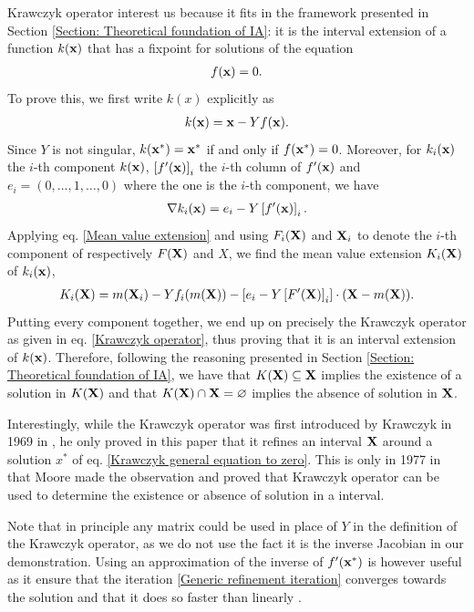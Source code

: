 \documentclass[
11pt, %
english, %
singlespacing, %
nolistspacing, %
liststotoc, %
headsepline, %
]{MastersDoctoralThesis} %
\begin{document}
Krawczyk operator interest us because it fits in the framework presented in Section \ref{Section: Theoretical foundation of IA}: it is the interval extension of a function $k(\boldsymbol{\mathrm{x}})$ that has a fixpoint for solutions of the equation
\begin{align}
	f(\boldsymbol{\mathrm{x}}) = 0. \label{Krawczyk general equation to zero}
\end{align}
To prove this, we first write $k(x)$ explicitly as
\begin{align}
	k(\boldsymbol{\mathrm{x}}) = \boldsymbol{\mathrm{x}} - Y f(\boldsymbol{\mathrm{x}}).
\end{align}
Since $Y$ is not singular, $k(\boldsymbol{\mathrm{x}}^*) = \boldsymbol{\mathrm{x}}^*$ if and only if $f(\boldsymbol{\mathrm{x}}^*) = 0$. Moreover, for $k_i(\boldsymbol{\mathrm{x}})$ the $i$-th component $k(\boldsymbol{\mathrm{x}})$, $\left[f'(\boldsymbol{\mathrm{x}})\right]_i$ the $i$-th column of $f'(\boldsymbol{\mathrm{x}})$ and $e_i = (0, \dots, 1, \dots, 0)$ where the one is the $i$-th component, we have
\begin{align}
	\nabla k_i(\boldsymbol{\mathrm{x}}) = e_i - Y \left[f'(\boldsymbol{\mathrm{x}})\right]_i.
\end{align}
Applying eq. \eqref{Mean value extension} and using $F_i(\boldsymbol{\mathrm{X}})$ and $\boldsymbol{\mathrm{X}}_i$ to denote the $i$-th component of respectively $F(\boldsymbol{\mathrm{X}})$ and $X$, we find the mean value extension $K_i(\boldsymbol{\mathrm{X}})$ of $k_i(\boldsymbol{\mathrm{x}})$,
\begin{align}
	K_i(\boldsymbol{\mathrm{X}}) = m(\boldsymbol{\mathrm{X}}_i) - Y f_i(m(\boldsymbol{\mathrm{X}})) - \left[e_i - Y \left[F'(\boldsymbol{\mathrm{X}})\right]_i\right] \cdot (\boldsymbol{\mathrm{X}} - m(\boldsymbol{\mathrm{X}})).
\end{align}
Putting every component together, we end up on precisely the Krawczyk operator as given in eq. \eqref{Krawczyk operator}, thus proving that it is an interval extension of $k(\boldsymbol{\mathrm{x}})$. Therefore, following the reasoning presented in Section \ref{Section: Theoretical foundation of IA}, we have that $K(\boldsymbol{\mathrm{X}}) \subseteq \boldsymbol{\mathrm{X}}$ implies the existence of a solution in $K(\boldsymbol{\mathrm{X}})$ and that $K(\boldsymbol{\mathrm{X}}) \cap \boldsymbol{\mathrm{X}} = \varnothing$ implies the absence of solution in $\boldsymbol{\mathrm{X}}$.

Interestingly, while the Krawczyk operator was first introduced by Krawczyk in 1969 in \cite{krawczyk1969newton}, he only proved in this paper that it refines an interval $\boldsymbol{\mathrm{X}}$ around a solution $x^*$ of eq. \eqref{Krawczyk general equation to zero}. This is only in 1977 in \cite{moore1977test} that Moore made the observation and proved that Krawczyk operator can be used to determine the existence or absence of solution in a interval.

Note that in principle any matrix could be used in place of $Y$ in the definition of the Krawczyk operator, as we do not use the fact it is the inverse Jacobian in our demonstration. Using an approximation of the inverse of $f'(\boldsymbol{\mathrm{x}}^*)$ is however useful as it ensure that the iteration \eqref{Generic refinement iteration} converges towards the solution and that it does so faster than linearly \cite{krawczyk1969newton}.
\end{document}

